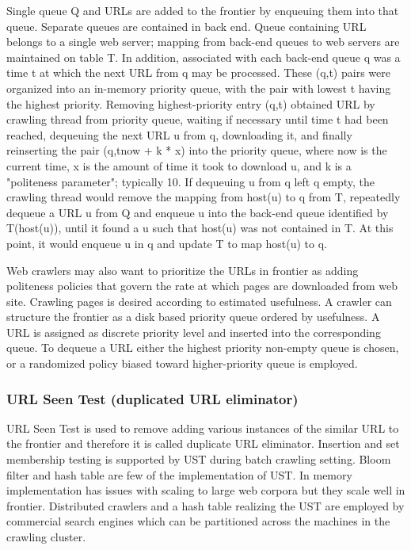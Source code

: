 \documentclass[article,type=msc,colorback,accentcolor=tud9c,twoside,11pt]{tudthesis}
\begin{document}
	Single queue Q and URLs are added to the frontier by enqueuing them into that queue. Separate queues are contained in back end. Queue containing URL belongs to a single web server; mapping from back-end queues to web servers are maintained on table T. In addition, associated with each back-end queue q was a time t at which the next URL from q may be processed. These (q,t) pairs were organized into an in-memory priority queue, with the pair with lowest t having the highest priority.  Removing highest-priority entry (q,t) obtained URL by crawling thread from priority queue, waiting if necessary until time t had been reached, dequeuing the next URL u from q, downloading it, and finally reinserting the pair (q,tnow + k * x) into the priority queue, where now is the current time, x is the amount of time it took to download u, and k is a "politeness parameter"; typically 10. If dequeuing u from q left q empty, the crawling thread would remove the mapping from host(u) to q from T, repeatedly dequeue a URL u from Q and enqueue u into the back-end queue identified by T(host(u)), until it found a u such that host(u) was not contained in T. At this point, it would enqueue u in q and update T to map host(u) to q.
	
	Web crawlers may also want to prioritize the URLs in  frontier as adding politeness policies that govern the rate at which pages are downloaded from web site. Crawling pages is desired according to estimated usefulness. A crawler can structure the frontier as a disk based priority queue ordered by usefulness. A URL is assigned as discrete priority level and inserted into the corresponding queue. To dequeue a URL either the highest priority non-empty queue is chosen, or a randomized policy biased toward higher-priority queue is employed.
	
	\subsubsection{URL Seen Test (duplicated URL eliminator)}
	URL Seen Test is used to remove adding various instances of the similar URL to the frontier and therefore it is called duplicate URL eliminator. Insertion and set membership testing is supported by UST during batch crawling setting. Bloom filter and hash table are few of the implementation of UST. In memory implementation has issues with scaling to large web corpora but they scale well in frontier. Distributed crawlers and a hash table realizing the UST are employed by commercial search engines which can be partitioned across the machines in the crawling cluster.
	
\end{document}

